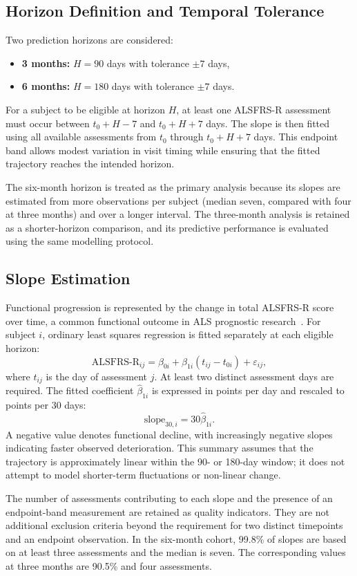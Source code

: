 \subsection{Horizon Definition and Temporal Tolerance}
\label{sec:methods_horizons}
Two prediction horizons are considered:
\begin{itemize}
  \item \textbf{3 months:} $H=90$ days with tolerance $\pm 7$ days,
  \item \textbf{6 months:} $H=180$ days with tolerance $\pm 7$ days.
\end{itemize}
For a subject to be eligible at horizon $H$, at least one \gls{ALSFRS-R} assessment must occur between $t_0+H-7$ and $t_0+H+7$ days. The slope is then fitted using all available assessments from $t_0$ through $t_0+H+7$ days. This endpoint band allows modest variation in visit timing while ensuring that the fitted trajectory reaches the intended horizon.

The six-month horizon is treated as the primary analysis because its slopes are estimated from more observations per subject (median seven, compared with four at three months) and over a longer interval. The three-month analysis is retained as a shorter-horizon comparison, and its predictive performance is evaluated using the same modelling protocol.

\subsection{Slope Estimation}
\label{sec:methods_slope}
Functional progression is represented by the change in total \gls{ALSFRS-R} score over time, a common functional outcome in \gls{ALS} prognostic research~\cite{Pancotti2022, Anani2023}. For subject $i$, ordinary least squares regression is fitted separately at each eligible horizon:
\[
  \mathrm{ALSFRS\mbox{-}R}_{ij}
  = \beta_{0i} + \beta_{1i}(t_{ij}-t_{0i}) + \varepsilon_{ij},
\]
where $t_{ij}$ is the day of assessment $j$. At least two distinct assessment days are required. The fitted coefficient $\hat{\beta}_{1i}$ is expressed in points per day and rescaled to points per 30 days:
\[
  \mathrm{slope}_{30,i}=30\hat{\beta}_{1i}.
\]
A negative value denotes functional decline, with increasingly negative slopes indicating faster observed deterioration. This summary assumes that the trajectory is approximately linear within the 90- or 180-day window; it does not attempt to model shorter-term fluctuations or non-linear change.

The number of assessments contributing to each slope and the presence of an endpoint-band measurement are retained as quality indicators. They are not additional exclusion criteria beyond the requirement for two distinct timepoints and an endpoint observation. In the six-month cohort, 99.8\% of slopes are based on at least three assessments and the median is seven. The corresponding values at three months are 90.5\% and four assessments.

